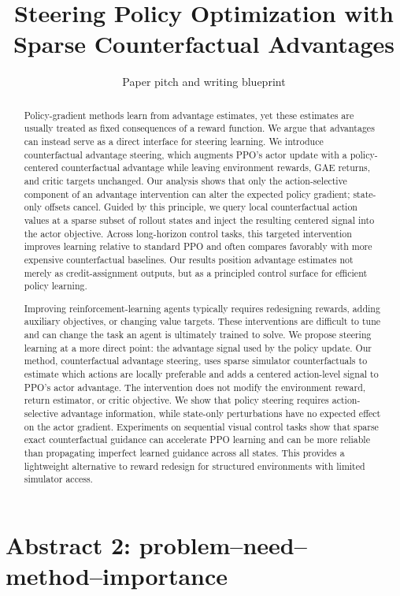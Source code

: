 \documentclass[11pt]{article}
\title{Steering Policy Optimization with Sparse Counterfactual Advantages}
\author{Paper pitch and writing blueprint}
\date{}
\begin{document}
\maketitle

\begin{abstract}
Policy-gradient methods learn from advantage estimates, yet these estimates
are usually treated as fixed consequences of a reward function. We argue that
advantages can instead serve as a direct interface for steering learning. We
introduce counterfactual advantage steering, which augments PPO's actor update
with a policy-centered counterfactual advantage while leaving environment
rewards, GAE returns, and critic targets unchanged. Our analysis shows that
only the action-selective component of an advantage intervention can alter the
expected policy gradient; state-only offsets cancel. Guided by this principle,
we query local counterfactual action values at a sparse subset of rollout
states and inject the resulting centered signal into the actor objective.
Across long-horizon control tasks, this targeted intervention improves learning
relative to standard PPO and often compares favorably with more expensive
counterfactual baselines. Our results position advantage estimates not merely
as credit-assignment outputs, but as a principled control surface for efficient
policy learning.
\end{abstract}

\section*{Abstract 2: problem--need--method--importance}
\begin{abstract}
Improving reinforcement-learning agents typically requires redesigning
rewards, adding auxiliary objectives, or changing value targets. These
interventions are difficult to tune and can change the task an agent is
ultimately trained to solve. We propose steering learning at a more direct
point: the advantage signal used by the policy update. Our method,
counterfactual advantage steering, uses sparse simulator counterfactuals to
estimate which actions are locally preferable and adds a centered action-level
signal to PPO's actor advantage. The intervention does not modify the
environment reward, return estimator, or critic objective. We show that policy
steering requires action-selective advantage information, while state-only
perturbations have no expected effect on the actor gradient. Experiments on
sequential visual control tasks show that sparse exact counterfactual guidance
can accelerate PPO learning and can be more reliable than propagating imperfect
learned guidance across all states. This provides a lightweight alternative to
reward redesign for structured environments with limited simulator access.
\end{abstract}
\end{document}
